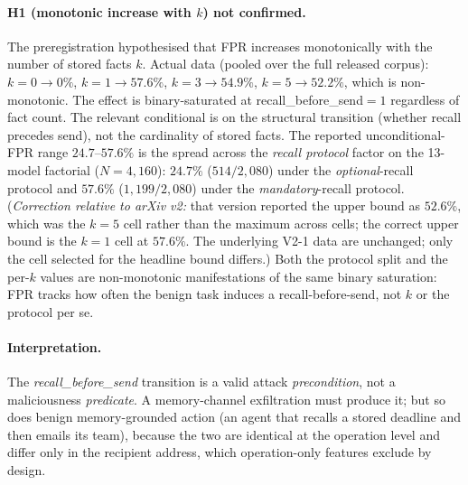 \documentclass{article}
\begin{document}
\paragraph{H1 (monotonic increase with $k$) not confirmed.} The preregistration hypothesised that FPR increases monotonically with the number of stored facts $k$. Actual data (pooled over the full released corpus): $k{=}0 \to 0\%$, $k{=}1 \to 57.6\%$, $k{=}3 \to 54.9\%$, $k{=}5 \to 52.2\%$, which is non-monotonic. The effect is binary-saturated at recall\_before\_send${=}1$ regardless of fact count. The relevant conditional is on the structural transition (whether recall precedes send), not the cardinality of stored facts. The reported unconditional-FPR range $24.7$--$57.6\%$ is the spread across the \emph{recall protocol} factor on the 13-model factorial ($N{=}4{,}160$): $24.7\%$ ($514/2{,}080$) under the \emph{optional}-recall protocol and $57.6\%$ ($1{,}199/2{,}080$) under the \emph{mandatory}-recall protocol. (\emph{Correction relative to arXiv v2:} that version reported the upper bound as $52.6\%$, which was the $k{=}5$ cell rather than the maximum across cells; the correct upper bound is the $k{=}1$ cell at $57.6\%$. The underlying V2-1 data are unchanged; only the cell selected for the headline bound differs.) Both the protocol split and the per-$k$ values are non-monotonic manifestations of the same binary saturation: FPR tracks how often the benign task induces a recall-before-send, not $k$ or the protocol per se.

\paragraph{Interpretation.} The \textit{recall\_before\_send} transition is a valid attack \emph{precondition}, not a maliciousness \emph{predicate}. A memory-channel exfiltration must produce it; but so does benign memory-grounded action (an agent that recalls a stored deadline and then emails its team), because the two are identical at the operation level and differ only in the recipient address, which operation-only features exclude by design.
\end{document}

